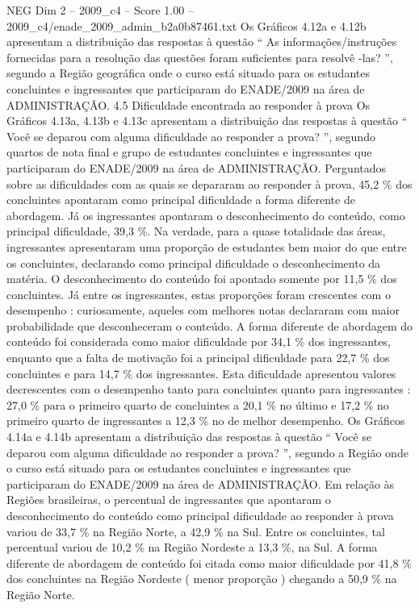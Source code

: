 \begin{textsample}{NEG Dim 2 – 2009\_c4 – Score 1.00 – 2009\_c4/enade\_2009\_admin\_b2a0b87461.txt}
Os Gráficos 4.12a e 4.12b apresentam a distribuição das respostas à questão “ As informações/instruções fornecidas para a resolução das questões foram suficientes para resolvê -las? ”, segundo a Região geográfica onde o curso está situado para os estudantes concluintes e ingressantes que participaram do ENADE/2009 na área de ADMINISTRAÇÃO. 4.5 Dificuldade encontrada ao responder à prova Os Gráficos 4.13a, 4.13b e 4.13c apresentam a distribuição das respostas à questão “ Você se deparou com alguma dificuldade ao responder a prova? ”, segundo quartos de nota final e grupo de estudantes concluintes e ingressantes que participaram do ENADE/2009 na área de ADMINISTRAÇÃO.
Perguntados sobre as dificuldades com as quais se depararam ao responder à prova, 45,2 \% dos concluintes apontaram como principal dificuldade a forma diferente de abordagem.
Já os ingressantes apontaram o desconhecimento do conteúdo, como principal dificuldade, 39,3 \%.
Na verdade, para a quase totalidade das áreas, ingressantes apresentaram uma proporção de estudantes bem maior do que entre os concluintes, declarando como principal dificuldade o desconhecimento da matéria.
O desconhecimento do conteúdo foi apontado somente por 11,5 \% dos concluintes.
Já entre os ingressantes, estas proporções foram crescentes com o desempenho : curiosamente, aqueles com melhores notas declararam com maior probabilidade que desconheceram o conteúdo.
A forma diferente de abordagem do conteúdo foi considerada como maior dificuldade por 34,1 \% dos ingressantes, enquanto que a falta de motivação foi a principal dificuldade para 22,7 \% dos concluintes e para 14,7 \% dos ingressantes.
Esta dificuldade apresentou valores decrescentes com o desempenho tanto para concluintes quanto para ingressantes : 27,0 \% para o primeiro quarto de concluintes a 20,1 \% no último e 17,2 \% no primeiro quarto de ingressantes a 12,3 \% no de melhor desempenho.
Os Gráficos 4.14a e 4.14b apresentam a distribuição das respostas à questão “ Você se deparou com alguma dificuldade ao responder a prova? ”, segundo a Região onde o curso está situado para os estudantes concluintes e ingressantes que participaram do ENADE/2009 na área de ADMINISTRAÇÃO.
Em relação às Regiões brasileiras, o percentual de ingressantes que apontaram o desconhecimento do conteúdo como principal dificuldade ao responder à prova variou de 33,7 \% na Região Norte, a 42,9 \% na Sul.
Entre os concluintes, tal percentual variou de 10,2 \% na Região Nordeste a 13,3 \%, na Sul.
A forma diferente de abordagem de conteúdo foi citada como maior dificuldade por 41,8 \% dos concluintes na Região Nordeste ( menor proporção ) chegando a 50,9 \% na Região Norte.

\end{textsample}
